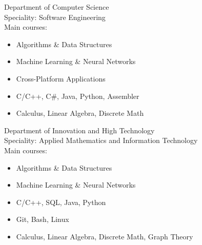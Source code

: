 \documentclass[10pt,a4paper,ragged2e]{altacv}
\begin{document}
Department of Computer Science\\
\smallskip
Speciality: Software Engineering\\
\smallskip
Main courses:
\smallskip
\begin{itemize}
    \item Algorithms \& Data Structures
    \item Machine Learning \& Neural Networks
    \item Cross-Platform Applications
    \item C/C++, C\#, Java, Python, Assembler
    \item Calculus, Linear Algebra, Discrete Math
\end{itemize}

\bigskip

Department of Innovation and High Technology\\
\smallskip
Speciality: Applied Mathematics and Information Technology\\
\smallskip
Main courses:
\smallskip
\begin{itemize}
    \item Algorithms \& Data Structures
    \item Machine Learning \& Neural Networks
    \item C/C++, SQL, Java, Python
    \item Git, Bash, Linux
    \item Calculus, Linear Algebra, Discrete Math, Graph Theory
\end{itemize}
\end{document}
